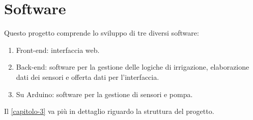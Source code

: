 \documentclass[12pt,a4paper,openright,twoside]{book}
\begin{document}
\section{Software}

Questo progetto comprende lo sviluppo di tre diversi software:
\begin{enumerate}
    \item Front-end: interfaccia web.
    \item Back-end: software per la gestione delle logiche di irrigazione, elaborazione dati dei sensori e offerta dati per l'interfaccia.
    \item Su Arduino: software per la gestione di sensori e pompa.
\end{enumerate}
Il \cref{capitolo-3} va più in dettaglio riguardo la struttura del progetto.
\end{document}
